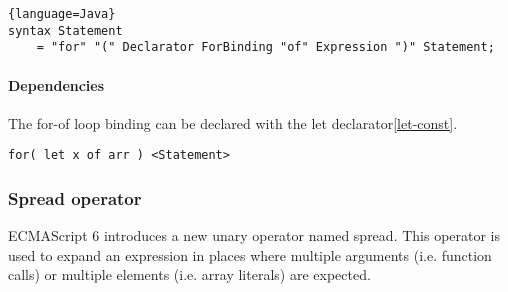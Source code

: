 \begin{lstlisting}{language=Java}
syntax Statement 
	= "for" "(" Declarator ForBinding "of" Expression ")" Statement;
\end{lstlisting}
    
\paragraph{Dependencies}
The for-of loop binding can be declared with the let declarator\ref{let-const}.

\begin{lstlisting}
for( let x of arr ) <Statement>
\end{lstlisting}


\subsubsection{Spread operator}
ECMAScript 6 introduces a new unary operator named spread\cite[12.3.6.1]{SpecJS}. This operator is used to expand an expression in places where multiple arguments (i.e. function calls) or multiple elements (i.e. array literals) are expected.

